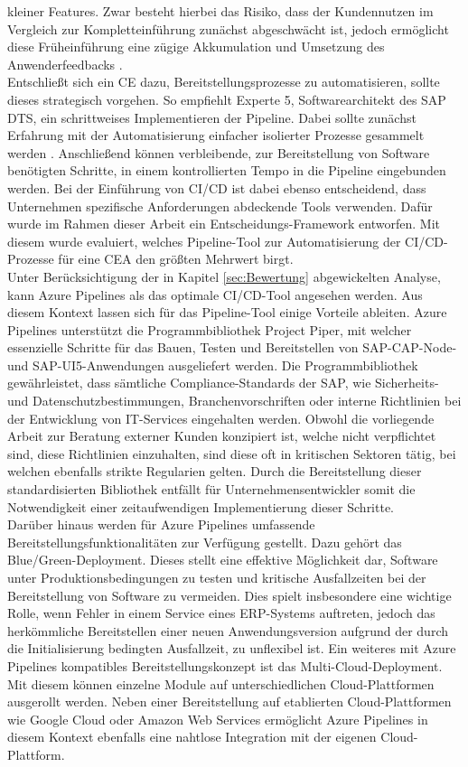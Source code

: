 kleiner Features. Zwar besteht hierbei das Risiko, dass der Kundennutzen im Vergleich zur Kompletteinführung zunächst abgeschwächt ist, jedoch ermöglicht diese Früheinführung eine zügige Akkumulation und Umsetzung des Anwenderfeedbacks \cite[9]{Halstenberg.2020}.\\ 
Entschließt sich ein CE dazu, Bereitstellungsprozesse zu automatisieren, sollte dieses strategisch vorgehen. So empfiehlt Experte 5, Softwarearchitekt des SAP DTS, ein schrittweises Implementieren der Pipeline. Dabei sollte zunächst Erfahrung mit der Automatisierung einfacher isolierter Prozesse gesammelt werden \cite[Z. 8 ff.]{SoftwareArchitektSAPDTSIntegration.}. Anschließend können verbleibende, zur Bereitstellung von Software benötigten Schritte, in einem kontrollierten Tempo in die Pipeline eingebunden werden. Bei der Einführung von CI/CD ist dabei ebenso entscheidend, dass Unternehmen spezifische Anforderungen abdeckende Tools verwenden. Dafür wurde im Rahmen dieser Arbeit ein Entscheidungs-Framework entworfen. Mit diesem wurde evaluiert, welches Pipeline-Tool zur Automatisierung der CI/CD-Prozesse für eine CEA den größten Mehrwert birgt.\\ Unter Berücksichtigung der in Kapitel \ref{sec:Bewertung} abgewickelten Analyse, kann Azure Pipelines als das optimale CI/CD-Tool angesehen werden. Aus diesem Kontext lassen sich für das Pipeline-Tool einige Vorteile ableiten. Azure Pipelines unterstützt die Programmbibliothek Project Piper, mit welcher essenzielle Schritte für das Bauen, Testen und Bereitstellen von SAP-CAP-Node- und SAP-UI5-Anwendungen ausgeliefert werden. Die Programmbibliothek gewährleistet, dass sämtliche Compliance-Standards der SAP, wie Sicherheits- und Datenschutzbestimmungen, Branchenvorschriften oder interne Richtlinien bei der Entwicklung von IT-Services eingehalten werden. Obwohl die vorliegende Arbeit zur Beratung externer Kunden konzipiert ist, welche nicht verpflichtet sind, diese Richtlinien einzuhalten, sind diese oft in kritischen Sektoren tätig, bei welchen ebenfalls strikte Regularien gelten. Durch die Bereitstellung dieser standardisierten Bibliothek entfällt für Unternehmensentwickler somit die Notwendigkeit einer zeitaufwendigen Implementierung dieser Schritte.\\ Darüber hinaus werden für Azure Pipelines umfassende Bereitstellungsfunktionalitäten zur Verfügung gestellt. Dazu gehört das Blue/Green-Deployment. Dieses stellt eine effektive Möglichkeit dar, Software unter Produktionsbedingungen zu testen und kritische Ausfallzeiten bei der Bereitstellung von Software zu vermeiden. Dies spielt insbesondere eine wichtige Rolle, wenn Fehler in einem Service eines ERP-Systems auftreten, jedoch das herkömmliche Bereitstellen einer neuen Anwendungsversion aufgrund der durch die Initialisierung  bedingten Ausfallzeit, zu unflexibel ist. Ein weiteres mit Azure Pipelines kompatibles Bereitstellungskonzept ist das Multi-Cloud-Deployment. Mit diesem können einzelne Module auf unterschiedlichen Cloud-Plattformen ausgerollt werden. Neben einer Bereitstellung auf etablierten Cloud-Plattformen wie Google Cloud oder Amazon Web Services ermöglicht Azure Pipelines in diesem Kontext ebenfalls eine nahtlose Integration mit der eigenen Cloud-Plattform.\\
